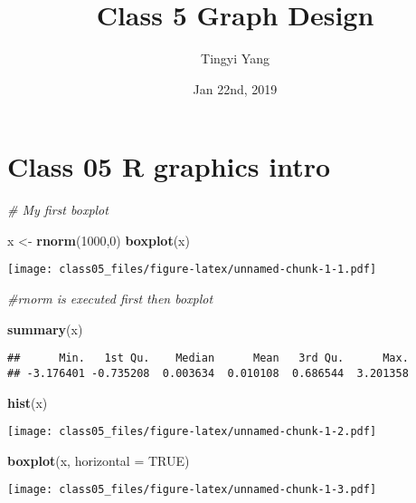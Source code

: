 \documentclass[]{article}
\title{Class 5 Graph Design}
\author{Tingyi Yang}
\date{Jan 22nd, 2019}
\newenvironment{Shaded}{\begin{snugshade}}{\end{snugshade}}
\newcommand{\KeywordTok}[1]{\textcolor[rgb]{0.13,0.29,0.53}{\textbf{#1}}}
\newcommand{\DataTypeTok}[1]{\textcolor[rgb]{0.13,0.29,0.53}{#1}}
\newcommand{\DecValTok}[1]{\textcolor[rgb]{0.00,0.00,0.81}{#1}}
\newcommand{\StringTok}[1]{\textcolor[rgb]{0.31,0.60,0.02}{#1}}
\newcommand{\CommentTok}[1]{\textcolor[rgb]{0.56,0.35,0.01}{\textit{#1}}}
\newcommand{\OtherTok}[1]{\textcolor[rgb]{0.56,0.35,0.01}{#1}}
\newcommand{\NormalTok}[1]{#1}
\begin{document}
\maketitle

\section{Class 05 R graphics intro}\label{class-05-r-graphics-intro}

\begin{Shaded}
\begin{Highlighting}[]
\CommentTok{# My first boxplot}

\NormalTok{x <-}\StringTok{ }\KeywordTok{rnorm}\NormalTok{(}\DecValTok{1000}\NormalTok{,}\DecValTok{0}\NormalTok{)}
\KeywordTok{boxplot}\NormalTok{(x)}
\end{Highlighting}
\end{Shaded}

\texttt{[image: class05\_files/figure-latex/unnamed-chunk-1-1.pdf]}

\begin{Shaded}
\begin{Highlighting}[]
\CommentTok{#rnorm is executed first then boxplot}

\KeywordTok{summary}\NormalTok{(x)}
\end{Highlighting}
\end{Shaded}

\begin{verbatim}
##      Min.   1st Qu.    Median      Mean   3rd Qu.      Max. 
## -3.176401 -0.735208  0.003634  0.010108  0.686544  3.201358
\end{verbatim}

\begin{Shaded}
\begin{Highlighting}[]
\KeywordTok{hist}\NormalTok{(x)}
\end{Highlighting}
\end{Shaded}

\texttt{[image: class05\_files/figure-latex/unnamed-chunk-1-2.pdf]}

\begin{Shaded}
\begin{Highlighting}[]
\KeywordTok{boxplot}\NormalTok{(x, }\DataTypeTok{horizontal =} \OtherTok{TRUE}\NormalTok{)}
\end{Highlighting}
\end{Shaded}

\texttt{[image: class05\_files/figure-latex/unnamed-chunk-1-3.pdf]}
\end{document}
